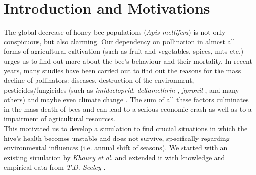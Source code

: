 \section{Introduction and Motivations}
The global decrease of honey bee populations (\textit{Apis mellifera}) is not only conspicuous, but also alarming. Our dependency on pollination in almost all forms of agricultural cultivation (such as fruit and vegetables, spices, nuts etc.) urges us to find out more about the bee's behaviour and their mortality. In recent years, many studies \cite{potts10} \cite{thomann13} have been carried out to find out the reasons for the mass decline of pollinators: diseases, destruction of the environment, pesticides/fungicides (such as \textit{imidacloprid}, \textit{deltamethrin} \cite{decourtye04}, \textit{fipronil} \cite{bernadou09}, and many others) and maybe even climate change \cite{schweiger10}. The sum of all these factors culminates in the mass death of bees and can lead to a serious economic crash as well as to a impairment of agricultural resources.\\
This motivated us to develop a simulation to find crucial situations in which the hive's health becomes unstable and does not survive, specifically regarding environmental influences (i.e. annual shift of seasons). We started with an existing simulation by \textit{Khoury et al.} \cite{khoury13} and extended it with knowledge and empirical data from \textit{T.D. Seeley} \cite{seeley95}.
